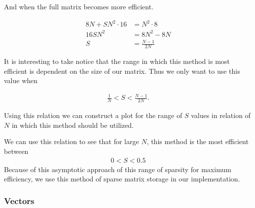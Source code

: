 \documentclass[../fem.tex]{subfiles}
\begin{document}
And when the full matrix becomes more efficient.

\begin{align*}
  8N+SN^2\cdot16&=N^2\cdot8\\
  16SN^2&=8N^2-8N\\
  S&=\frac{N-1}{2N}
\end{align*}

It is interesting to take notice that the range in which this method is most
efficient is dependent on the size of our matrix. Thus we only want to use this
value when

\begin{align*}
  \frac{1}{N}<S<\frac{N-1}{2N}.
\end{align*}

Using this relation we can construct a plot for the range of $S$ values in
relation of $N$ in which this method should be utilized.


We can use this relation to see that for large $N$, this method is the most
efficient between
\begin{align*}
  0 < S < 0.5
\end{align*}
Because of this asymptotic approach of this range of sparsity for maximum
efficiency, we use this method of sparse matrix storage in our implementation.

\begin{Figure}
  \begin{center}
  \end{center}
  \label{fig:mat_CRS}
\end{Figure}

\subsubsection{Vectors}%
\label{ssub:vectors}
\end{document}
